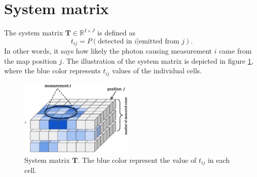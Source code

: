 \section{System matrix}
\label{sec:system}
The system matrix $\mathbf{T} \in \mathbb{R}^{I \times J}$ is defined as
\begin{equation}
t_{ij} =  P(\textrm{detected in } i | \textrm{emitted from } j).
\end{equation}
In other words, it says how likely the photon causing measurement $i$ came from the map position $j$.
The illustration of the system matrix is depicted in figure \ref{fig:sys_ilustration}, where the blue color represents $t_{ij}$ values of the individual cells. 
\begin{figure}[!h]
  \centering
    \includegraphics[width=0.48\textwidth]{./fig/photos/sys.eps}
  \caption{System matrix $\mathbf{T}$. The blue color represent the value of $t_{ij}$ in each cell.}
    \label{fig:sys_ilustration}
\end{figure}


